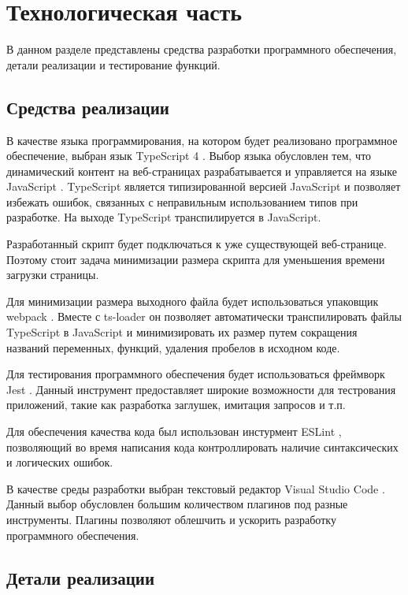 \chapter{Технологическая часть}

В данном разделе представлены средства разработки программного обеспечения, детали реализации и тестирование функций.

\section{Средства реализации}

В качестве языка программирования, на котором будет реализовано программное обеспечение, выбран язык TypeScript 4 \cite{ts}. Выбор языка обусловлен тем, что динамический контент на веб-страницах разрабатывается и управляется на языке JavaScript \cite{js}. TypeScript является типизированной версией JavaScript и позволяет избежать ошибок, связанных с неправильным использованием типов при разработке. На выходе TypeScript транспилируется в JavaScript.

Разработанный скрипт будет подключаться к уже существующей веб-странице. Поэтому стоит задача минимизации размера скрипта для уменьшения времени загрузки страницы.

Для минимизации размера выходного файла будет использоваться упаковщик webpack \cite{webpack}. Вместе с ts-loader \cite{tsloader} он позволяет автоматически транспилировать файлы TypeScript в JavaScript и минимизировать их размер путем сокращения названий переменных, функций, удаления пробелов в исходном коде.

Для тестирования программного обеспечения будет использоваться фреймворк \cite{framework} Jest \cite{jest}. Данный инструмент предоставляет широкие возможности для тестрования приложений, такие как разработка заглушек, имитация запросов и т.п.

Для обеспечения качества кода был использован инстурмент ESLint \cite{eslint}, позволяющий во время написания кода контроллировать наличие синтаксических и логических ошибок.

В качестве среды разработки выбран текстовый редактор Visual Studio Code \cite{vscode}. Данный выбор обусловлен большим количеством плагинов под разные инструменты. Плагины позволяют облешчить и ускорить разработку программного обеспечения.

\section{Детали реализации}


